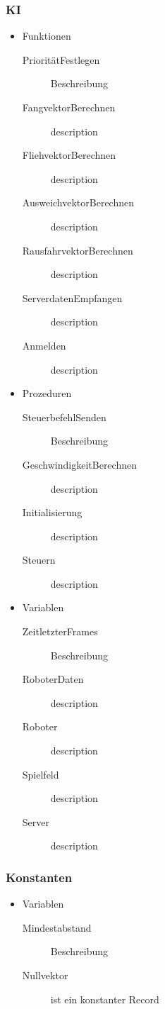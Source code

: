 \subsubsection{KI}
\begin{itemize}
	\item Funktionen
	\begin{description}
		\item[PrioritätFestlegen] Beschreibung
		\item[FangvektorBerechnen] description
		\item[FliehvektorBerechnen] description
		\item[AusweichvektorBerechnen] description
		\item[RausfahrvektorBerechnen] description
		\item[ServerdatenEmpfangen] description
		\item[Anmelden] description
	\end{description}
	\item Prozeduren
	\begin{description}
		\item[SteuerbefehlSenden] Beschreibung
		\item[GeschwindigkeitBerechnen] description
		\item[Initialisierung] description
		\item[Steuern] description
	\end{description}
	\item Variablen
	\begin{description}
		\item[ZeitletzterFrames] Beschreibung
		\item[RoboterDaten] description
		\item[Roboter] description	
		\item[Spielfeld] description
		\item[Server] description	
	\end{description}
\end{itemize}

\subsubsection{Konstanten}
\begin{itemize}
	\item Variablen
	\begin{description}
		\item[Mindestabstand] Beschreibung
		\item[Nullvektor] ist ein konstanter Record
	\end{description}
\end{itemize}


